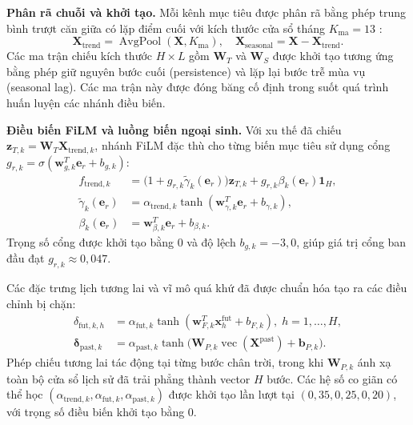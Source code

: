 \documentclass[10pt,journal,compsoc]{IEEEtran}
\begin{document}
\noindent \textbf{Phân rã chuỗi và khởi tạo.} Mỗi kênh mục tiêu được phân rã bằng phép trung bình trượt căn giữa có lặp điểm cuối với kích thước cửa sổ tháng $K_{\text{ma}}=13$ \cite{zeng2023dlinear}:
\begin{equation}
\mathbf{X}_{\text{trend}} = \operatorname{AvgPool}(\mathbf{X}, K_{\text{ma}}), \quad \mathbf{X}_{\text{seasonal}} = \mathbf{X} - \mathbf{X}_{\text{trend}}.
\label{eq:decomp}
\end{equation}
Các ma trận chiếu kích thước $H\times L$ gồm $\mathbf{W}_T$ và $\mathbf{W}_S$ được khởi tạo tương ứng bằng phép giữ nguyên bước cuối (persistence) và lặp lại bước trễ mùa vụ (seasonal lag). Các ma trận này được đóng băng cố định trong suốt quá trình huấn luyện các nhánh điều biến.

\noindent \textbf{Điều biến FiLM và luồng biến ngoại sinh.} Với xu thế đã chiếu $\mathbf{z}_{T,k}=\mathbf{W}_T\mathbf{X}_{\text{trend},k}$, nhánh FiLM đặc thù cho từng biến mục tiêu \cite{perez2018film} sử dụng cổng $g_{r,k}=\sigma(\mathbf{w}_{g,k}^T\mathbf{e}_r+b_{g,k})$:
\begin{equation}
\begin{aligned}
f_{\text{trend}, k} &= \big(1 + g_{r,k} \tilde{\gamma}_k(\mathbf{e}_r)\big) \mathbf{z}_{T,k} + g_{r,k} \beta_k(\mathbf{e}_r)\mathbf{1}_H, \\
\tilde{\gamma}_k(\mathbf{e}_r) &= \alpha_{\text{trend}, k} \tanh(\mathbf{w}_{\gamma, k}^T \mathbf{e}_r + b_{\gamma, k}), \\
\beta_k(\mathbf{e}_r) &= \mathbf{w}_{\beta, k}^T \mathbf{e}_r + b_{\beta, k}.
\end{aligned}
\label{eq:film_trend}
\end{equation}
Trọng số cổng được khởi tạo bằng 0 và độ lệch $b_{g,k}=-3{,}0$, giúp giá trị cổng ban đầu đạt $g_{r,k}\approx0{,}047$.

Các đặc trưng lịch tương lai và vĩ mô quá khứ đã được chuẩn hóa tạo ra các điều chỉnh bị chặn:
\begin{equation}
\begin{aligned}
\delta_{\text{fut}, k, h} &= \alpha_{\text{fut}, k} \tanh(\mathbf{w}_{F, k}^T \mathbf{x}^{\text{fut}}_h + b_{F, k}), \; h = 1, \dots, H, \\
\boldsymbol{\delta}_{\text{past}, k} &= \alpha_{\text{past}, k} \tanh\big(\mathbf{W}_{P, k} \operatorname{vec}(\mathbf{X}^{\text{past}}) + \mathbf{b}_{P, k}\big).
\end{aligned}
\label{eq:exo_streams}
\end{equation}
Phép chiếu tương lai tác động tại từng bước chân trời, trong khi $\mathbf{W}_{P,k}$ ánh xạ toàn bộ cửa sổ lịch sử đã trải phẳng thành vector $H$ bước. Các hệ số co giãn có thể học $(\alpha_{\text{trend},k},\alpha_{\text{fut},k},\alpha_{\text{past},k})$ được khởi tạo lần lượt tại $(0{,}35, 0{,}25, 0{,}20)$, với trọng số điều biến khởi tạo bằng 0.
\end{document}
